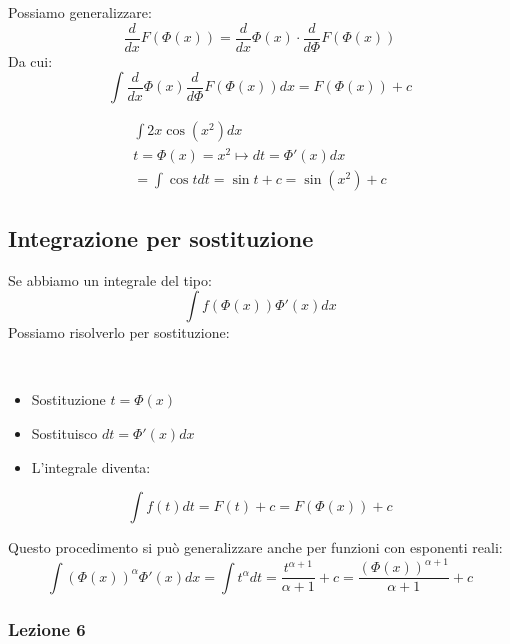 Possiamo generalizzare:
\begin{equation}
    \frac{d}{dx}F(\Phi(x))= \frac{d}{dx}\Phi(x) \cdot \frac{d}{d\Phi}F(\Phi(x))
\end{equation}
Da cui:
\begin{equation}
    \int \frac{d}{dx}\Phi(x) \frac{d}{d\Phi}F(\Phi(x))dx = F(\Phi(x)) + c
\end{equation}

\begin{esempio}
    \begin{gather}
        \int 2x\cos(x^2)dx \\
        t = \Phi(x)=x^2 \mapsto dt = \Phi'(x)dx \\
        = \int \cos t dt = \sin t + c = \sin(x^2) +c
    \end{gather}
\end{esempio}

\subsection{Integrazione per sostituzione}
Se abbiamo un integrale del tipo:
\begin{equation}
    \int f(\Phi(x)) \Phi'(x) dx
\end{equation}
Possiamo risolverlo per sostituzione:

\begin{definizione}
    \leavevmode \\
    \begin{itemize}
        \item Sostituzione $ t = \Phi(x)$
        \item Sostituisco $dt = \Phi'(x)dx$
        \item L'integrale diventa:
    \end{itemize}
    \begin{equation}
        \int f(t) dt = F(t) + c = F(\Phi(x)) + c
    \end{equation}
\end{definizione}

Questo procedimento si può generalizzare anche per funzioni con esponenti reali:
\begin{equation}
    \int (\Phi(x))^{\alpha} \Phi'(x)dx = \int t^\alpha dt = \frac{t^{\alpha + 1}}{\alpha + 1} + c = \frac{(\Phi(x))^{\alpha + 1}}{\alpha + 1} + c
\end{equation}

\subsubsection{Lezione 6}
